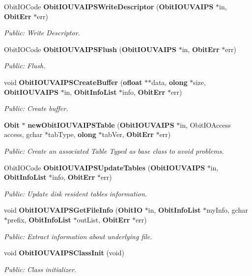 \begin{CompactItemize}
Obit\-IOCode {\bf Obit\-IOUVAIPSWrite\-Descriptor} ({\bf Obit\-IOUVAIPS} $\ast$in, {\bf Obit\-Err} $\ast$err)
\begin{CompactList}\small\item\em Public: Write Descriptor. \item\end{CompactList}\item 
Obit\-IOCode {\bf Obit\-IOUVAIPSFlush} ({\bf Obit\-IOUVAIPS} $\ast$in, {\bf Obit\-Err} $\ast$err)
\begin{CompactList}\small\item\em Public: Flush. \item\end{CompactList}\item 
void {\bf Obit\-IOUVAIPSCreate\-Buffer} ({\bf ofloat} $\ast$$\ast$data, {\bf olong} $\ast$size, {\bf Obit\-IOUVAIPS} $\ast$in, {\bf Obit\-Info\-List} $\ast$info, {\bf Obit\-Err} $\ast$err)
\begin{CompactList}\small\item\em Public: Create buffer. \item\end{CompactList}\item 
{\bf Obit} $\ast$ {\bf new\-Obit\-IOUVAIPSTable} ({\bf Obit\-IOUVAIPS} $\ast$in, Obit\-IOAccess access, gchar $\ast$tab\-Type, {\bf olong} $\ast$tab\-Ver, {\bf Obit\-Err} $\ast$err)
\begin{CompactList}\small\item\em Public: Create an associated Table Typed as base class to avoid problems. \item\end{CompactList}\item 
Obit\-IOCode {\bf Obit\-IOUVAIPSUpdate\-Tables} ({\bf Obit\-IOUVAIPS} $\ast$in, {\bf Obit\-Info\-List} $\ast$info, {\bf Obit\-Err} $\ast$err)
\begin{CompactList}\small\item\em Public: Update disk resident tables information. \item\end{CompactList}\item 
void {\bf Obit\-IOUVAIPSGet\-File\-Info} ({\bf Obit\-IO} $\ast$in, {\bf Obit\-Info\-List} $\ast$my\-Info, gchar $\ast$prefix, {\bf Obit\-Info\-List} $\ast$out\-List, {\bf Obit\-Err} $\ast$err)
\begin{CompactList}\small\item\em Public: Extract information about underlying file. \item\end{CompactList}\item 
void {\bf Obit\-IOUVAIPSClass\-Init} (void)
\begin{CompactList}\small\item\em Public: Class initializer. \item\end{CompactList}\end{CompactItemize}


